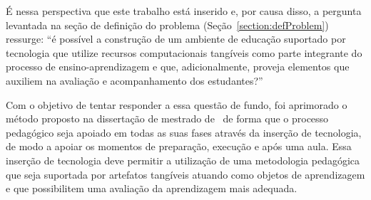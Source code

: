 
É nessa perspectiva que este trabalho está inserido e, por causa disso, a pergunta levantada na seção de definição do problema (Seção~\ref{section:defProblem}) ressurge: ``é possível a construção de um ambiente de educação suportado por tecnologia que utilize recursos computacionais tangíveis como parte integrante do processo de ensino-aprendizagem e que, adicionalmente, proveja elementos que auxiliem na avaliação e acompanhamento dos estudantes?''




Com o objetivo de tentar responder a essa questão de fundo, foi aprimorado o método proposto na dissertação de mestrado de~\cite{leitao:2017} de forma 
que o processo pedagógico seja apoiado em todas as suas fases através da inserção de tecnologia, de modo a apoiar os momentos de preparação, execução e após uma aula. Essa inserção de tecnologia 
deve permitir a utilização de uma metodologia pedagógica que seja suportada por artefatos tangíveis atuando como objetos de aprendizagem e que possibilitem uma avaliação da aprendizagem mais adequada.

